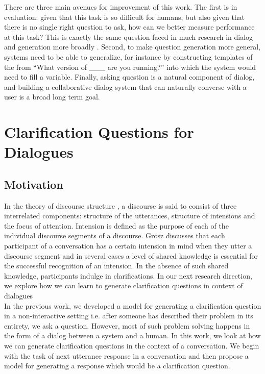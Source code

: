 \documentclass[11pt]{report}
\renewcommand\cite{\citep}	%
\begin{document}
There are three main avenues for improvement of this work.
The first is in evaluation: given that this task is so difficult for humans, but also given that there is no single right question to ask, how can we better measure performance at this task?
This is exactly the same question faced in much research in dialog and generation more broadly \cite{paek2001empirical,lowe2015ubuntu,liu2016not,kannan2017adversarial}.
Second, to make question generation more general, systems need to be able to generalize, for instance by constructing templates of the from ``What version of \_\_\_ are you running?'' into which the system would need to fill a variable. Finally, asking question is a natural component of dialog, and building a collaborative dialog system that can naturally converse with a user is a broad long term goal.


\newpage

\chapter{Clarification Questions for Dialogues}\label{dialogue_next_response}

\section{Motivation}

\noindent
In the theory of discourse structure \cite{grosz1986attention}, a discourse is said to consist of three interrelated components: structure of the utterances, structure of intensions and the focus of attention. Intension is defined as the purpose of each of the individual discourse segments of a discourse. Grosz discusses that each participant of a conversation has a certain intension in mind when they utter a discourse segment and in several cases a level of shared knowledge is essential for the successful recognition of an intension. In the absence of such shared knowledge, participants indulge in clarifications. In our next research direction, we explore how we can learn to generate clarification questions in context of dialogues\\

\noindent
In the previous work, we developed a model for generating a clarification question in a non-interactive setting i.e. after someone has described their problem in its entirety, we ask a question. However, most of such problem solving happens in the form of a dialog between a system and a human. In this work, we look at how we can generate clarification questions in the context of a conversation. We begin with the task of next utterance response in a conversation and then propose a model for generating a response which would be a clarification question.
\end{document}
